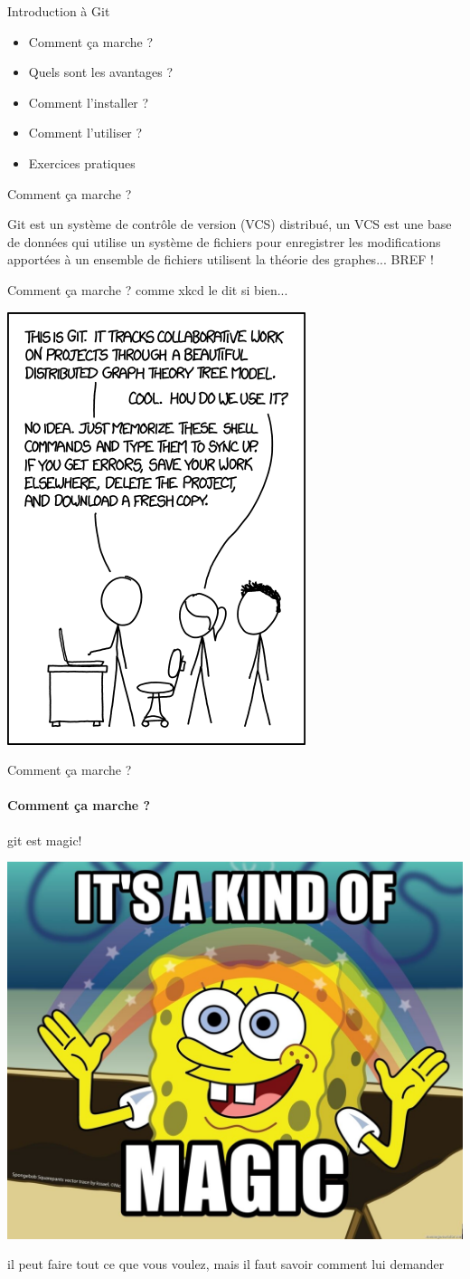 \documentclass[usenames,dvipsnames]{beamer}
\begin{document}
\begin{frame}[fragile]{Introduction à Git}
	\begin{itemize}
		\item Comment ça marche ?
		\item Quels sont les avantages ?
		\item Comment l'installer ?
		\item Comment l'utiliser ?
		\item Exercices pratiques
	\end{itemize}
\end{frame}


\begin{frame}[fragile]{Comment ça marche ?}
	
	Git est un système de contrôle de version (VCS) distribué, un VCS est une base de données qui utilise un système de fichiers pour enregistrer les modifications apportées à un ensemble de fichiers utilisent la théorie des graphes... BREF !
\end{frame}

\begin{frame}[fragile]{Comment ça marche ?}
	comme xkcd le dit si bien...
	\begin{center}
		\includegraphics[width=0.4\linewidth]{Im/git_xkcd.png}
	\end{center}
\end{frame}

\begin{frame}[fragile]{Comment ça marche ?}
	\framesubtitle{Comment ça marche ?}
	
	git est magic!
	\begin{center}
		\includegraphics[width=0.4\linewidth]{Im/its-a-kind-of-magic.jpg}
	\end{center}

	il peut faire tout ce que vous voulez, mais il faut savoir comment lui demander

\end{frame}
\end{document}
